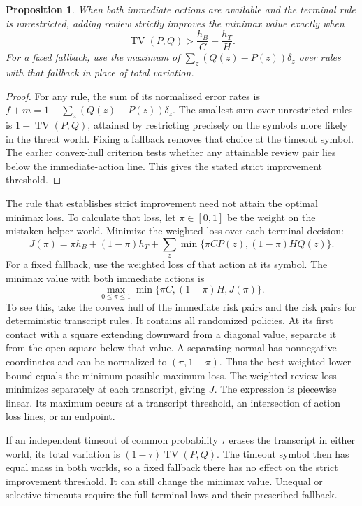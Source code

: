 \documentclass[11pt]{article}
\newtheorem{proposition}{Proposition}
\begin{document}
\begin{proposition}
When both immediate actions are available and the terminal
rule is unrestricted, adding review strictly improves the minimax
value exactly when
\[
 \operatorname{TV}(P,Q)>\frac{h_B}{C}+\frac{h_T}{H}.
\]
For a fixed fallback, use the maximum of
$\sum_z(Q(z)-P(z))\delta_z$ over rules with that fallback
in place of total variation.
\end{proposition}
\begin{proof}
For any rule, the sum of its normalized error rates is
$f+m=1-\sum_z(Q(z)-P(z))\delta_z$. The smallest sum over
unrestricted rules is $1-\operatorname{TV}(P,Q)$, attained
by restricting precisely on the symbols more likely in the
threat world. Fixing a fallback removes that choice at the
timeout symbol. The earlier convex-hull criterion tests whether
any attainable review pair lies below the immediate-action line.
This gives the stated strict improvement threshold.
\end{proof}

The rule that establishes strict improvement need not attain
the optimal minimax loss. To calculate that loss, let
$\pi\in[0,1]$ be the weight on the mistaken-helper world.
Minimize the weighted loss over each terminal decision:
\[
 J(\pi)=\pi h_B+(1-\pi)h_T+
 \sum_z\min\{\pi C P(z),(1-\pi)H Q(z)\}.
\]
For a fixed fallback, use the weighted loss of that action
at its symbol. The minimax value with both immediate actions is
\[
 \max_{0\le\pi\le1}\min\{\pi C,(1-\pi)H,J(\pi)\}.
\]
To see this, take the convex hull of the immediate risk pairs
and the risk pairs for deterministic transcript rules. It
contains all randomized policies. At its first contact with
a square extending downward from a diagonal value, separate
it from the open square below that value. A separating normal
has nonnegative coordinates and can be normalized to
$(\pi,1-\pi)$. Thus the best weighted lower bound equals the
minimum possible maximum loss. The weighted review loss
minimizes separately at each transcript, giving $J$.
The expression is piecewise linear. Its maximum occurs at a
transcript threshold, an intersection of action loss lines,
or an endpoint.

If an independent timeout of common probability $\tau$ erases
the transcript in either world, its total variation is
$(1-\tau)\operatorname{TV}(P,Q)$. The timeout symbol then
has equal mass in both worlds, so a fixed fallback there has
no effect on the strict improvement threshold. It can still
change the minimax value. Unequal or selective timeouts require
the full terminal laws and their prescribed fallback.
\end{document}
